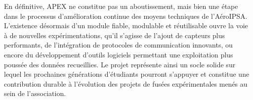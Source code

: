 \documentclass{article}
\begin{document}
En définitive, APEX ne constitue pas un aboutissement, mais bien une étape dans
le processus d’amélioration continue des moyens techniques de l’AéroIPSA.
L’existence désormais d’un module fiable, modulable et réutilisable ouvre la
voie à de nouvelles expérimentations, qu’il s’agisse de l’ajout de capteurs
plus performants, de l’intégration de protocoles de communication innovants,
ou encore du développement d’outils logiciels permettant une exploitation
plus poussée des données recueillies. Le projet représente ainsi un socle
solide sur lequel les prochaines générations d’étudiants pourront s’appuyer
et constitue une contribution durable à l’évolution des projets de fusées
expérimentales menés au sein de l’association.
\end{document}
